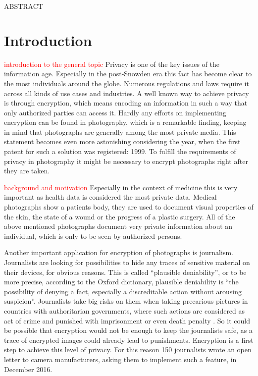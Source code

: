\documentclass[12pt,a4paper,titlepage,oneside]{scrartcl}
\newcommand\todo[1]{\textcolor{red}{#1}}
\begin{document}
\maketitle
\setcounter{section}{0}
\setcounter{tocdepth}{2}
\tableofcontents
\newpage

ABSTRACT

\section{Introduction}

\todo{introduction to the general topic}
Privacy is one of the key issues of the information age.
Especially in the post-Snowden era this fact has become clear to the most individuals around the globe. 
Numerous regulations and laws \cite{EHG2015, DSG2000, ELGA2012, EuropeanParliament2016, EuropeanCourtofHumanRights2010} require it across all kinds of use cases and industries.
A well known way to achieve privacy is through encryption, which means encoding an information in such a way that only authorized parties can access it. 
Hardly any efforts on implementing encryption can be found in photography, which is a remarkable finding, keeping in mind that photographs are generally among the most private media.
This statement becomes even more astonishing considering the year, when the first patent for such a solution was registered: 1999. \cite{steinberg1999method}
To fulfill the requirements of privacy in photography it might be necessary to encrypt photographs right after they are taken.

\todo{background and motivation}
Especially in the context of medicine this is very important as health data is considered the most private data. \cite{williams2013}
Medical photographs show a patients body, they are used to document visual properties of the skin, the state of a wound or the progress of a plastic surgery. 
All of the above mentioned photographs document very private information about an individual, which is only to be seen by authorized persons.

Another important application for encryption of photographs is journalism.
Journalists are looking for possibilities to hide any traces of sensitive material on their devices, for obvious reasons.
This is called ``plausible deniability'', or to be more precise, according to the Oxford dictionary, plausible deniability is ``the possibility of denying a fact, especially a discreditable action without arousing suspicion''.\cite{OxforddictPlausibleDen}
Journalists take big risks on them when taking precarious pictures in countries with authoritarian governments, where such actions are considered as act of crime and punished with imprisonment or even death penalty \cite{Amnesty2016}.
So it could be possible that encryption would not be enough to keep the journalists safe, as a trace of encrypted images could already lead to punishments.
Encryption is a first step to achieve this level of privacy.
For this reason 150 journalists wrote an open letter to camera manufacturers, asking them to implement such a feature, in December 2016.\cite{fp2016}
\end{document}
